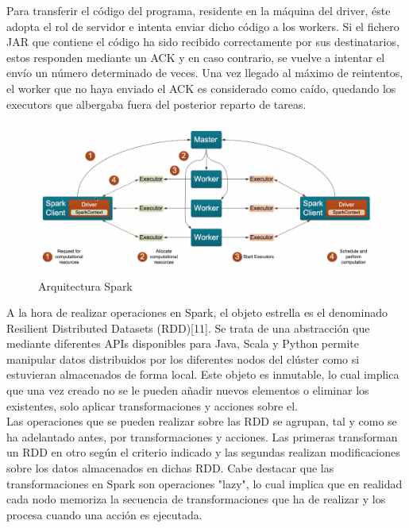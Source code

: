 Para transferir el código del programa, residente en la máquina del driver, éste adopta  el rol de servidor e intenta enviar dicho código a los workers. Si el fichero JAR que contiene el código ha sido recibido correctamente por sus destinatarios, estos responden mediante un ACK y en caso contrario, se vuelve a intentar el envío un número determinado de veces. Una vez llegado al máximo de reintentos, el worker que no haya enviado el ACK es considerado como caído, quedando los executors que albergaba fuera del posterior reparto de tareas.\\

\begin{figure}[h]
	\centering
	\includegraphics[width=1\textwidth]{Ilustraciones/spark_architecture.png}
	\caption{Arquitectura Spark}
	\label{fig:spark_architecture}
\end{figure}

A la hora de realizar operaciones en Spark, el objeto estrella es el denominado Resilient Distributed Datasets (RDD)[11]. Se trata de una abstracción que mediante diferentes APIs disponibles para Java, Scala y Python permite manipular datos distribuidos por los diferentes nodos del clúster como si estuvieran almacenados de forma local. Este objeto es inmutable, lo cual implica que una vez creado no se le pueden añadir nuevos elementos o eliminar los existentes, solo aplicar transformaciones y acciones sobre el.\\

Las operaciones que se pueden realizar sobre las RDD se agrupan, tal y como se ha adelantado antes, por transformaciones y acciones. Las primeras transforman un RDD en otro según el criterio indicado y las segundas realizan modificaciones sobre los datos almacenados en dichas RDD. Cabe destacar que las transformaciones en Spark son operaciones "lazy", lo cual implica que en realidad cada nodo memoriza la secuencia de transformaciones que ha de realizar y los procesa cuando una acción es ejecutada.\\

